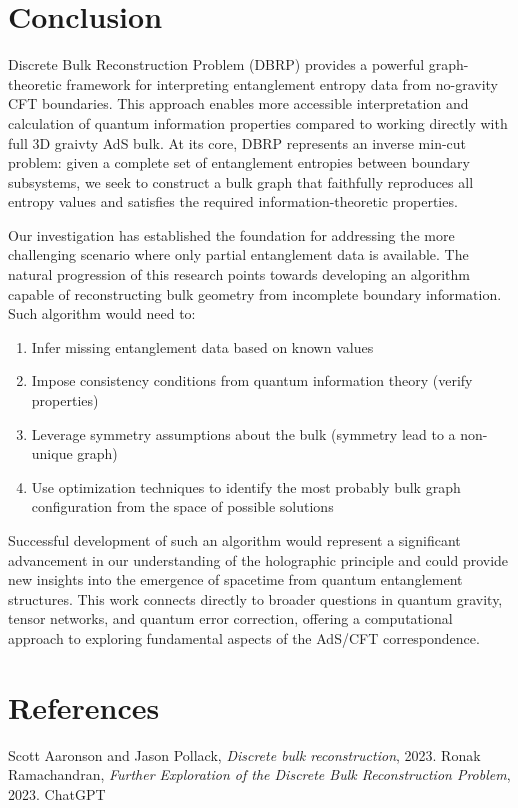 \documentclass[12pt]{article}
\begin{document}
\section{Conclusion}

\hspace{0.5cm} Discrete Bulk Reconstruction Problem (DBRP) provides a powerful graph-theoretic framework for interpreting entanglement entropy data from no-gravity CFT boundaries. This approach enables more accessible interpretation and calculation of quantum information properties compared to working directly with full 3D graivty AdS bulk. At its core, DBRP represents an inverse min-cut problem: given a complete set of entanglement entropies between boundary subsystems, we seek to construct a bulk graph that faithfully reproduces all entropy values and satisfies the required information-theoretic properties. 

Our investigation has established the foundation for addressing the more challenging scenario where only partial entanglement data is available. The natural progression of this research points towards developing an algorithm capable of reconstructing bulk geometry from incomplete boundary information.
Such algorithm would need to:
\begin{enumerate}
    \item Infer missing entanglement data based on known values
    \item Impose consistency conditions from quantum information theory (verify properties)
    \item Leverage symmetry assumptions about the bulk (symmetry lead to a non-unique graph)
    \item Use optimization techniques to identify the most probably bulk graph configuration from the space of possible solutions
\end{enumerate}

Successful development of such an algorithm would represent a significant advancement in our understanding of the holographic principle and could provide new insights into the emergence of spacetime from quantum entanglement structures. This work connects directly to broader questions in quantum gravity, tensor networks, and quantum error correction, offering a computational approach to exploring fundamental aspects of the AdS/CFT correspondence.

\newpage

\section{References}
\renewcommand{\refname}{}
\begin{thebibliography}{9}
    Scott Aaronson and Jason Pollack, \textit{Discrete bulk reconstruction}, 2023.
    Ronak Ramachandran, \textit{Further Exploration of the Discrete Bulk Reconstruction Problem}, 2023.
    ChatGPT
\end{thebibliography}
\end{document}
